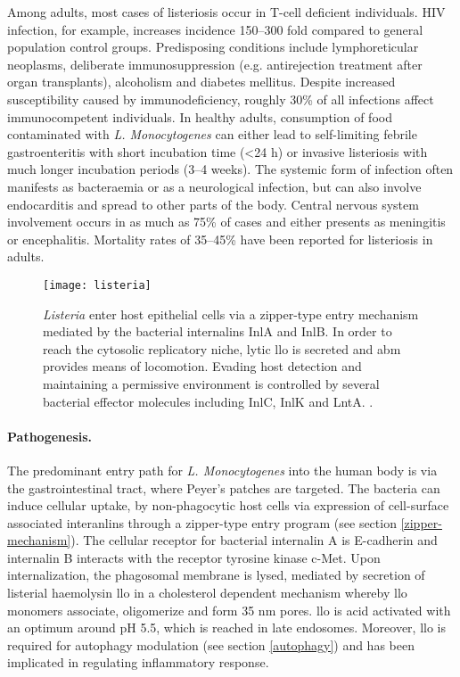Among adults, most cases of listeriosis occur in T-cell deficient individuals. HIV infection, for example, increases incidence 150--300 fold compared to general population control groups. Predisposing conditions include lymphoreticular neoplasms, deliberate immunosuppression (e.g. antirejection treatment after organ transplants), alcoholism and diabetes mellitus. Despite increased susceptibility caused by immunodeficiency, roughly 30\% of all infections affect immunocompetent individuals. In healthy adults, consumption of food contaminated with \textit{L. Monocytogenes} can either lead to self-limiting febrile gastroenteritis with short incubation time (\textless 24 h) or invasive listeriosis with much longer incubation periods (3--4 weeks). The systemic form of infection often manifests as bacteraemia or as a neurological infection, but can also involve endocarditis and spread to other parts of the body. Central nervous system involvement occurs in as much as 75\% of cases and either presents as meningitis or encephalitis. Mortality rates of 35--45\% have been reported for listeriosis in adults.

\begin{figure}
  \centering
  \texttt{[image: listeria]}
  \caption[A selection of features relevant for infection of epithelial cells by \textit{Listeria}.]{\textit{Listeria} enter host epithelial cells via a zipper-type entry mechanism mediated by the bacterial internalins InlA and InlB. In order to reach the cytosolic replicatory niche, lytic \gls{llo} is secreted and \gls{abm} provides means of locomotion. Evading host detection and maintaining a permissive environment is controlled by several bacterial effector molecules including InlC, InlK and LntA. \citep{Cossart2014}.}
  \label{fig:listeria}
\end{figure}

\paragraph{Pathogenesis.}
The predominant entry path for \textit{L. Monocytogenes} into the human body is via the gastrointestinal tract, where Peyer's patches are targeted. The bacteria can induce cellular uptake, by non-phagocytic host cells via expression of cell-surface associated interanlins through a zipper-type entry program (see section \ref{zipper-mechanism}). The cellular receptor for bacterial internalin A is E-cadherin and internalin B interacts with the receptor tyrosine kinase c-Met. Upon internalization, the phagosomal membrane is lysed, mediated by secretion of listerial haemolysin \gls{llo} in a cholesterol dependent mechanism whereby \gls{llo} monomers associate, oligomerize and form 35 nm pores. \gls{llo} is acid activated with an optimum around pH 5.5, which is reached in late endosomes. Moreover, \gls{llo} is required for autophagy modulation (see section \ref{autophagy}) and has been implicated in regulating inflammatory response.

